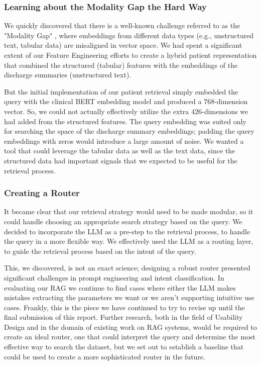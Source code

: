 \documentclass[acmtog]{acmart}
\begin{document}
\subsubsection{Learning about the Modality Gap the Hard Way}

We quickly discovered that there is a well-known challenge referred to as the "Modality Gap" \cite{liang2022modalitygap}, where embeddings from different data types (e.g., unstructured text, tabular data) are misaligned in vector space. We had spent a significant extent of our Feature Engineering efforts to create a hybrid patient representation that combined the structured (tabular) features with the embeddings of the discharge summaries (unstructured text).

But the initial implementation of our patient retrieval simply embedded the query with the clinical BERT embedding model and produced a $768$-dimension vector. So, we could not actually effectively utilize the extra $426$-dimensions we had added from the structured features. The query embedding was suited only for searching the space of the discharge summary embeddings; padding the query embeddings with zeros would introduce a large amount of noise. We wanted a tool that could leverage the tabular data as well as the text data, since the structured data had important signals that we expected to be useful for the retrieval process.

\subsubsection{Creating a Router}
It became clear that our retrieval strategy would need to be made modular, so it could handle choosing an appropriate search strategy based on the query. We decided to incorporate the LLM as a pre-step to the retrieval process, to handle the query in a more flexible way. We effectively used the LLM as a routing layer, to guide the retrieval process based on the intent of the query. 

This, we discovered, is not an exact science; designing a robust router presented significant challenges in prompt engineering and intent classification. In evaluating our RAG we continue to find cases where either the LLM makes mistakes extracting the parameters we want or we aren't supporting intuitive use cases. Frankly, this is the piece we have continued to try to revise up until the final submission of this report. Further research, both in the field of Usability Design and in the domain of existing work on RAG systems, would be required to create an ideal router, one that could interpret the query and determine the most effective way to search the dataset, but we set out to establish a baseline that could be used to create a more sophisticated router in the future.
\end{document}
